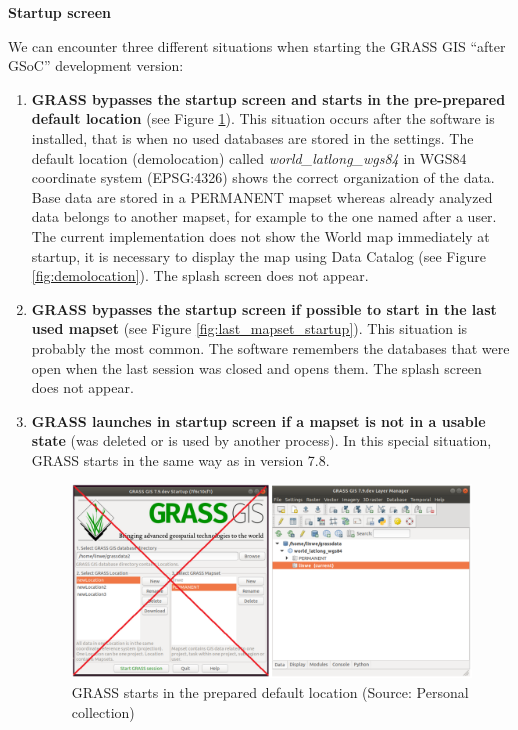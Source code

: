 \documentclass[a4paper,10pt,twoside]{article}
\begin{document}
\newpage
\vspace*{-1cm}
\bigskip
\noindent \textbf {Startup screen}

\noindent We can encounter three different situations when starting the GRASS GIS ``after GSoC'' development version:

\begin{enumerate}

\item \textbf{GRASS bypasses the startup screen and starts in the pre-prepared default location} (see Figure \ref{fig:demolocation_startup}). This situation occurs after the software is installed, that is when no used databases are stored in the settings. The default location (demolocation) called \textit{world\_latlong\_wgs84} in WGS84 coordinate system (EPSG:4326) shows the correct organization of the data. Base data are stored in a PERMANENT mapset whereas already analyzed data belongs to another mapset, for example to the one named after a user. The current implementation does not show the World map immediately at startup, it is necessary to display the map using Data Catalog (see Figure \ref{fig:demolocation}). The splash screen does not appear.
\item\textbf{ GRASS bypasses the startup screen if possible to start in the last used mapset} (see Figure \ref{fig:last_mapset_startup}). This situation is probably the most common. The software remembers the databases that were open when the last session was closed and opens them.  The splash screen does not appear.
\item \textbf{GRASS launches in startup screen if a mapset is not in a usable state} (was deleted or is used by another process). In this special situation, GRASS starts in the same way as in version 7.8.

\vspace{0.3cm}
\begin{figure}[hbt!] 
\begin{center}
\includegraphics[width=17cm]{../pictures/demolocation_startup.png} 
\caption[GRASS starts in the prepared default location]{GRASS starts in the prepared default location (Source: Personal collection)}
\label{fig:demolocation_startup}
\end{center}
\end{figure}


\end{enumerate}
\end{document}
